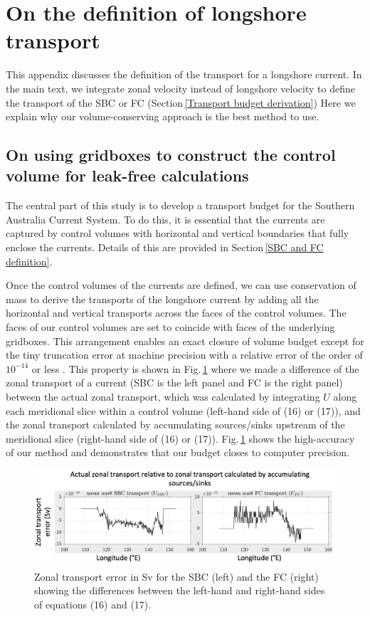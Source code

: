 \documentclass[preprint,3p,review,12pt]{elsarticle}
\begin{document}
\section{On the definition of longshore transport} \label{Reasoning for defining the SBC transport and the FC transport from their zonal transport}
This appendix discusses the definition of the transport for a longshore current. In the main text, we integrate zonal velocity instead of longshore velocity to define the transport of the SBC or FC (Section\,\ref{Transport budget derivation}) Here we explain why our volume-conserving approach is the best method to use.

\subsection{On using gridboxes to construct the control volume for leak-free calculations} \label{leak-free}
The central part of this study is to develop a transport budget for the Southern Australia Current System. To do this, it is essential that the currents are captured by control volumes with horizontal and vertical boundaries that fully enclose the currents. Details of this are provided in Section\,\ref{SBC and FC definition}.

Once the control volumes of the currents are defined, we can use conservation of mass to derive the transports of the longshore current by adding all the horizontal and vertical transports across the faces of the control volumes. The faces of our control volumes are set to coincide with faces of the underlying gridboxes. This arrangement enables an exact closure of volume budget except for the tiny truncation error at machine precision with a relative error of the order of $10^{-14}$ or less
\citep{Furue2019}. This property is shown in Fig.\,\ref{Slide1_2} where we made a difference of the zonal transport of a current (SBC is the left panel and FC is the right panel) between the actual zonal transport, which was calculated by integrating $U$ along each meridional slice within a control volume (left-hand side of (16) or (17)), and the zonal transport calculated by accumulating sources/sinks upstream of the meridional slice (right-hand side of (16) or (17)). Fig.\,\ref{Slide1_2} shows the high-accuracy of our method and demonstrates that our budget closes to computer precision.
%
\begin{figure}[tb]
    \includegraphics[width=1\textwidth, height=1\textheight, keepaspectratio]{Slide1_2.jpg}
    \caption{\label{Slide1_2}%
    Zonal transport error in Sv for the SBC (left) and the FC (right) showing the differences between the left-hand and right-hand sides of equations (16) and (17).}
\end{figure}
\end{document}
